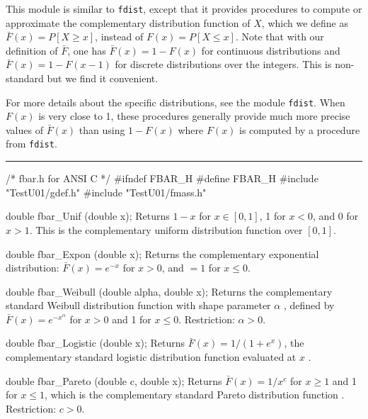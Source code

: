 
This module is similar to {\tt fdist}, except that it provides procedures
to compute or approximate the complementary distribution function of $X$,
which we define as $\bar F(x) = P[X\ge x]$, instead of $F(x)=P[X\le x]$.
Note that with our definition of $\bar F$, one has
$\bar F(x) = 1 - F(x)$ for continuous distributions and
$\bar F(x) = 1 - F(x-1)$ for discrete distributions over the integers.
This is non-standard but we find it convenient.

For more details about the specific distributions,
see the module {\tt fdist}.
When $F(x)$ is very close to 1, these procedures generally provide much
more precise values of $\bar F(x)$ than using $1-F(x)$ where $F(x)$ is
computed by a procedure from {\tt fdist}.


\bigskip
\hrule
\code\hide
/* fbar.h for ANSI C */
#ifndef FBAR_H
#define FBAR_H
\endhide
#include "TestU01/gdef.h"
#include "TestU01/fmass.h"
\endcode


\code

double fbar_Unif (double x);
\endcode
  \tab
  Returns $1-x$ for $x \in [0, 1]$, 1 for $x<0$, and 0 for $x>1$.
  This is the complementary uniform distribution function over $[0, 1]$.
 \endtab
\code


double fbar_Expon (double x);
\endcode
  \tab
  Returns the complementary exponential distribution:
  $\bar F(x) = e^{- x}$ for $x>0$, and $=1$ for $x\le 0$.
 \endtab
\code


double fbar_Weibull (double alpha, double x);
\endcode
  \tab
  Returns the complementary standard Weibull distribution function
  with shape parameter $\alpha$ \cite{tJOH95a}, defined by
  $\bar F(x) = e^{- x^\alpha}$ for $x>0$ and 1 for $x\le 0$.
  Restriction: $\alpha > 0$.
 \endtab
\code


double fbar_Logistic (double x);
\endcode
  \tab
  Returns $\bar F(x) = 1/(1 + e^{x})$, the complementary standard
  logistic distribution function evaluated at $x$ \cite{tJOH95b}.
 \endtab
\code


double fbar_Pareto (double c, double x);
\endcode
  \tab
  Returns $\bar F(x) = 1/x^c$ for $x\ge 1$ and 1 for $x\le 1$,
  which is the complementary standard Pareto
  distribution function \cite{tJOH95a}.
  Restriction: $c > 0$.
 \endtab
\code



